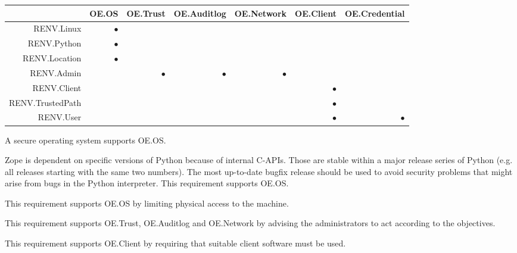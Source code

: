 \documentclass[12pt,english]{scrbook}
\newcommand{\oh}{$\bullet$}
\begin{document}
\begin{longtable}{r|R|R|R|R|R|R|}
        \toprule
                        & OE.OS & OE.Trust & OE.Auditlog & OE.Network & OE.Client & OE.Credential \\
        \midrule\endhead
RENV.Linux             & \oh   &          &             &            &           &               \\
RENV.Python            & \oh   &          &             &            &           &               \\
RENV.Location          & \oh   &          &             &            &           &               \\
RENV.Admin             &       & \oh      & \oh         & \oh        &           &               \\
RENV.Client            &       &          &             &            & \oh       &               \\
RENV.TrustedPath       &       &          &             &            & \oh       &               \\
RENV.User              &       &          &             &            & \oh       &  \oh          \\
        \bottomrule
\end{longtable}


A secure operating system supports OE.OS.


Zope is dependent on specific versions of Python because of internal C-APIs.
Those are stable within a major release series of Python (e.g. all releases
starting with the same two numbers). The most up-to-date bugfix release should
be used to avoid security problems that might arise from bugs in the Python
interpreter. This requirement supports OE.OS.


This requirement supports OE.OS by limiting physical access to the machine.


This requirement supports OE.Trust, OE.Auditlog and OE.Network by advising the
administrators to act according to the objectives.


This requirement supports OE.Client by requiring that suitable client software must be used.
\end{document}
